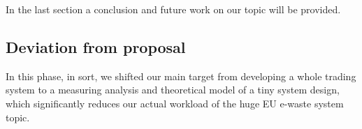 \documentclass[sigchi-a, authorversion]{acmart}
\begin{document}
In the last section a conclusion and future work on our topic will be provided.

\subsection{Deviation from proposal}

In this phase, in sort, we shifted our main target from developing a whole trading system to
a measuring analysis and theoretical model of a tiny system design, which significantly reduces 
our actual workload of the huge EU e-waste system topic.



\end{document}
